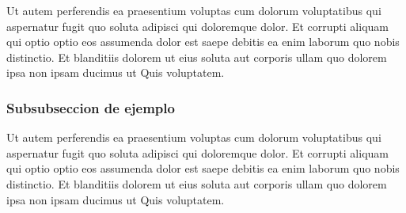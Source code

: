         
        Ut autem perferendis ea praesentium voluptas cum dolorum voluptatibus qui aspernatur fugit quo soluta adipisci qui doloremque dolor. Et corrupti aliquam qui optio optio eos assumenda dolor est saepe debitis ea enim laborum quo nobis distinctio. Et blanditiis dolorem ut eius soluta aut corporis ullam quo dolorem ipsa non ipsam ducimus ut Quis voluptatem.
        \subsubsection{Subsubseccion de ejemplo}
            Ut autem perferendis ea praesentium voluptas cum dolorum voluptatibus qui aspernatur fugit quo soluta adipisci qui doloremque dolor. Et corrupti aliquam qui optio optio eos assumenda dolor est saepe debitis ea enim laborum quo nobis distinctio. Et blanditiis dolorem ut eius soluta aut corporis ullam quo dolorem ipsa non ipsam ducimus ut Quis voluptatem.\cite{Bibtex}
        
